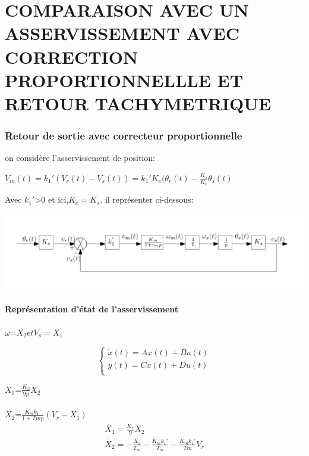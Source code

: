 \chapter{COMPARAISON AVEC UN ASSERVISSEMENT AVEC CORRECTION PROPORTIONNELLLE ET RETOUR TACHYMETRIQUE}
\subsection{Retour de sortie avec correcteur proportionnelle}

on considère l'asservissement de position:\\
\begin{center}
$V_m(t)=k_1'(V_r(t)-V_s(t))=k_1'K_e(\theta_r(t)-\frac{K_s}{K_e}\theta_s(t)$
\end{center}
Avec $k_1'$>0 et ici,$K_e=K_s$. il représenter  ci-dessous:
\\


\begin{center}
\includegraphics[scale=0.5]{fiiig3.png} 
\label{fig3}
\end{center}


\subsubsection{Représentation d'état de l'asservissement}
$\omega$=$X_2 et V_s=X_1$

\begin{equation*}
\left\{\begin{matrix}
\dot{x}(t)=Ax(t)+Bu(t)\\ 
y(t)=Cx(t)+Du(t)\\
\end{matrix}\right.
\end{equation*}   


$X_1$=$\frac{K_S}{9p}X_2$\\\\


$X_2$=$\frac{K_mk_1'}{1+Tmp}(V_r-X_1)$\\

\begin{equation*}
\begin{matrix}
\dot{X_1}=\frac{K_s}{9}X_2\\
\dot{X_2}=-\frac{X_2}{T_m}-\frac{K_mk_1'}{T_m}-\frac{K_mk_1'}{Tm}V_r
\end{matrix}
\end{equation*}
\\

